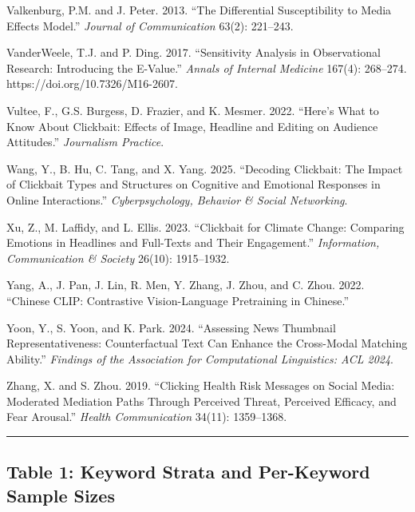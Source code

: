 \documentclass[
  12pt,
]{article}
\begin{document}
Valkenburg, P.M. and J. Peter. 2013. ``The Differential Susceptibility
to Media Effects Model.'' \emph{Journal of Communication} 63(2):
221--243.

VanderWeele, T.J. and P. Ding. 2017. ``Sensitivity Analysis in
Observational Research: Introducing the E-Value.'' \emph{Annals of
Internal Medicine} 167(4): 268--274. https://doi.org/10.7326/M16-2607.

Vultee, F., G.S. Burgess, D. Frazier, and K. Mesmer. 2022. ``Here's What
to Know About Clickbait: Effects of Image, Headline and Editing on
Audience Attitudes.'' \emph{Journalism Practice}.

Wang, Y., B. Hu, C. Tang, and X. Yang. 2025. ``Decoding Clickbait: The
Impact of Clickbait Types and Structures on Cognitive and Emotional
Responses in Online Interactions.'' \emph{Cyberpsychology, Behavior \&
Social Networking}.

Xu, Z., M. Laffidy, and L. Ellis. 2023. ``Clickbait for Climate Change:
Comparing Emotions in Headlines and Full-Texts and Their Engagement.''
\emph{Information, Communication \& Society} 26(10): 1915--1932.

Yang, A., J. Pan, J. Lin, R. Men, Y. Zhang, J. Zhou, and C. Zhou. 2022.
``Chinese CLIP: Contrastive Vision-Language Pretraining in Chinese.''

Yoon, Y., S. Yoon, and K. Park. 2024. ``Assessing News Thumbnail
Representativeness: Counterfactual Text Can Enhance the Cross-Modal
Matching Ability.'' \emph{Findings of the Association for Computational
Linguistics: ACL 2024}.

Zhang, X. and S. Zhou. 2019. ``Clicking Health Risk Messages on Social
Media: Moderated Mediation Paths Through Perceived Threat, Perceived
Efficacy, and Fear Arousal.'' \emph{Health Communication} 34(11):
1359--1368.

\begin{center}\rule{0.5\linewidth}{0.5pt}\end{center}

\subsection{Table 1: Keyword Strata and Per-Keyword Sample
Sizes}\label{table-1-keyword-strata-and-per-keyword-sample-sizes}
\end{document}

